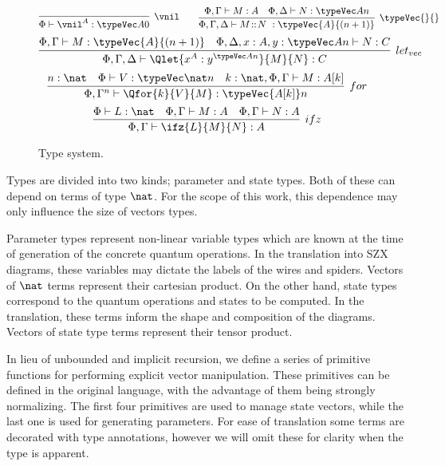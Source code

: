 \begin{figure}[hpt]
\begin{mdframed}
\[    \]
    \[
        \infer[\vnil]{\Phi\vdash \vnil^A:\typeVec A 0}{}
        \qquad
        \infer[\typeVec{}{}]{\Phi,\Gamma,\Delta\vdash M\!::\!N\ :\typeVec{A}{(n+1)}}{\Phi,\Gamma\vdash M:A & \Phi,\Delta\vdash N: \typeVec A n}
    \]
    \[
        \infer[let_{vec}]{\Phi,\Gamma,\Delta\vdash \Qlet{x^A : y^{\typeVec A n}}{M}{N}:C}{\Phi,\Gamma\vdash M:\typeVec{A}{(n+1)} & \Phi,\Delta,x:A,y:\typeVec A n\vdash N: C}
    \]
    \[
        \infer[for]{\Phi, \Gamma^n \vdash \Qfor{k}{V}{M} : \typeVec {A[k]} n}{n:\nat & \Phi\vdash V:\typeVec \nat n & k:\nat,\Phi,\Gamma \vdash M:A[k]}
    \]
    \[
        \infer[ifz]{\Phi, \Gamma \vdash \ifz{L}{M}{N} : A}{\Phi \vdash L:\nat & \Phi,\Gamma\vdash M:A & \Phi,\Gamma\vdash N: A}
    \]
    \caption{Type system.}%
    \label{fig:linear-fragment-typing}
\end{mdframed}
\end{figure}

Types are divided into two kinds; parameter and state types. Both of these can
depend on terms of type $\nat$. For the scope of this work, this dependence may
only influence the size of vectors types.

Parameter types represent non-linear variable types which are known at the time
of generation of the concrete quantum operations. In the translation into SZX
diagrams, these variables may dictate the labels of the wires and spiders.
Vectors of $\nat$ terms represent their cartesian product.
%
On the other hand, state types correspond to the quantum operations and states
to be computed. In the translation, these terms inform the shape and composition
of the diagrams. Vectors of state type terms represent their tensor product.

In lieu of unbounded and implicit recursion, we define a series of primitive
functions for performing explicit vector manipulation. These primitives can be
defined in the original language, with the advantage of them being strongly
normalizing. The first four primitives are used to manage state vectors, while
the last one is used for generating parameters. For ease of translation some
terms are decorated with type annotations, however we will omit these for
clarity when the type is apparent.

